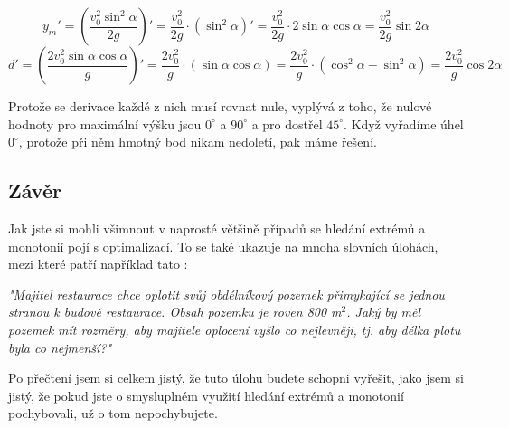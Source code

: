 \documentclass{fkssolpub}
\begin{document}
\[
  y_m' = \left(\frac{v_0^2 \sin^2{\alpha}}{2g}\right)' = \frac{v_0^2}{2g}
    \cdot (\sin^2{\alpha})' = \frac{v_0^2}{2g} \cdot 2 \sin{\alpha} \cos{\alpha}
    = \frac{v_0^2}{2g} \sin{2 \alpha}
\]
\[
  d' = (\frac{2 v_0^2 \sin{\alpha} \cos{\alpha}}{g})' = \frac{2 v_0^2}{g}
    \cdot (\sin{\alpha} \cos{\alpha}) = \frac{2 v_0^2}{g}
    \cdot (\cos^2{\alpha} - \sin^2{\alpha}) = \frac{2 v_0^2}{g} \cos{2 \alpha}
\]

Protože se derivace každé z nich musí rovnat nule, vyplývá z toho, že
nulové hodnoty pro maximální výšku jsou $0^{\circ}$ a $90^{\circ}$ a pro dostřel
$45^{\circ}$. Když vyřadíme úhel $0^{\circ}$, protože při něm hmotný bod nikam
nedoletí, pak máme řešení.

\subsection{Závěr}
Jak jste si mohli všimnout v naprosté většině případů se hledání extrémů
a monotonií pojí s optimalizací. To se také ukazuje na 
mnoha slovních úlohách, mezi které patří například tato 
\cite{jelinkova_aplikacni_2013}:

\textit{"Majitel restaurace chce oplotit svůj obdélníkový pozemek přimykající se jednou stranou
k budově restaurace. Obsah pozemku je roven 800 m$^2$. Jaký by měl pozemek mít rozměry,
aby majitele oplocení vyšlo co nejlevněji, tj. aby délka plotu byla co nejmenší?"}

Po přečtení jsem si celkem jistý, že tuto úlohu budete schopni vyřešit,
jako jsem si jistý, že pokud jste o smysluplném využití hledání extrémů
a monotonií pochybovali, už o tom nepochybujete.

\printbibliography[title=Zdroje]
\end{document}

